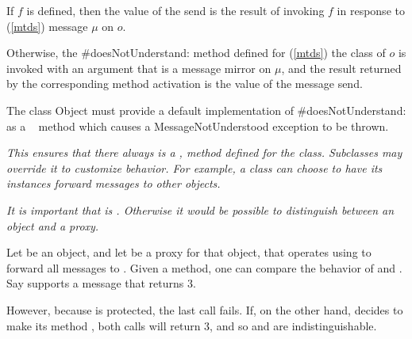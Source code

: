 \documentclass{article}
\newcommand{\code}[1]{{\sf #1}}
\begin{document}
If $f$ is defined, then the value of the send is the result of invoking $f$ in response to (\ref{mtds}) message $\mu$ on $o$. 

Otherwise, the \code{\#doesNotUnderstand:} method  defined for (\ref{mtds}) the class of $o$ is invoked
with an argument that is a message mirror on $\mu$, and the result  returned by the corresponding method activation is the value of the message send.

The class \code{Object} must provide a default implementation of \code{\#doesNotUnderstand:} as a \ \PROTECTED{} method which causes a \code{MessageNotUnderstood} exception to be thrown.

{\it
This ensures that there always is a , method defined for the class.
Subclasses may override it to customize behavior. For example, a class can choose to have its instances  forward messages to other objects.
}

{\it
It is important that  is \PROTECTED{}. Otherwise it would be possible to distinguish between an object and a proxy. 

Let  be an object, and let  be a proxy for that object, that
operates using  to forward all messages to .
Given a \PUBLIC{}  method, one can compare the behavior
of  and . Say  supports a message  that returns 3.





However, because   is protected, the last call fails. If, on the other hand,    decides to make its    method \PUBLIC{}, both calls will return 3, and so  and  are indistinguishable.
}
\end{document}
